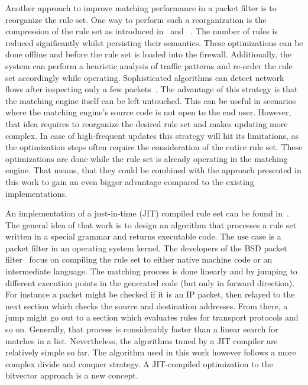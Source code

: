 \documentclass[conference]{IEEEtran}
\begin{document}
Another approach to improve matching performance in a packet filter is to reorganize the rule set.
One way to perform such a reorganization is the compression of the rule set as 
introduced in~\cite{redundancy_removal} and ~\cite{firewall_compressor}.
The number of rules is reduced significantly whilst persisting their semantics.
These optimizations can be done offline and before the rule set is loaded into the firewall.
Additionally, the system can perform a heuristic analysis of  
traffic patterns and re-order the rule set accordingly while operating.
Sophisticated algorithms can detect network flows after inspecting only a few packets~\cite{trafficonthefly}.
The advantage of this strategy is that the matching engine itself can be left untouched.
This can be useful in scenarios where the matching engine's source code is not open to the end user.
However, that idea requires to reorganize the desired rule set and makes updating more complex.
In case of high-frequent updates this strategy will hit its limitations, 
as the optimization steps often require the consideration of the entire rule set.
These optimizations are done while the rule set is already operating in 
the matching engine.
That means, that they could be combined with the approach presented in this work to
gain an even bigger advantage compared to the existing implementations.

An implementation of a just-in-time (JIT) compiled rule set can be found in~\cite{dpf}.
The general idea of that work is to design an algorithm that processes a rule set
written in a special grammar and returns executable code.
The use case is a packet filter in an operating system kernel.
The developers of the BSD packet filter~\cite{bpf,bpfplus} focus on compiling the rule set to 
either native machine code or an intermediate language.
The matching process is done linearly and by jumping to different execution 
points in the generated code (but only in forward direction).
For instance a packet might be checked if it is an IP packet, then relayed 
to the next section which checks the source and destination addresses.
From there, a jump might go out to a section which evaluates rules for transport protocols and so on.
Generally, that process is considerably faster than a linear search for matches in a list.
Nevertheless, the algorithms tuned by a JIT compiler are relatively simple so far.
The algorithm used in this work however follows a more complex divide and conquer strategy.
A JIT-compiled optimization to the bitvector approach is a new concept.
\end{document}
